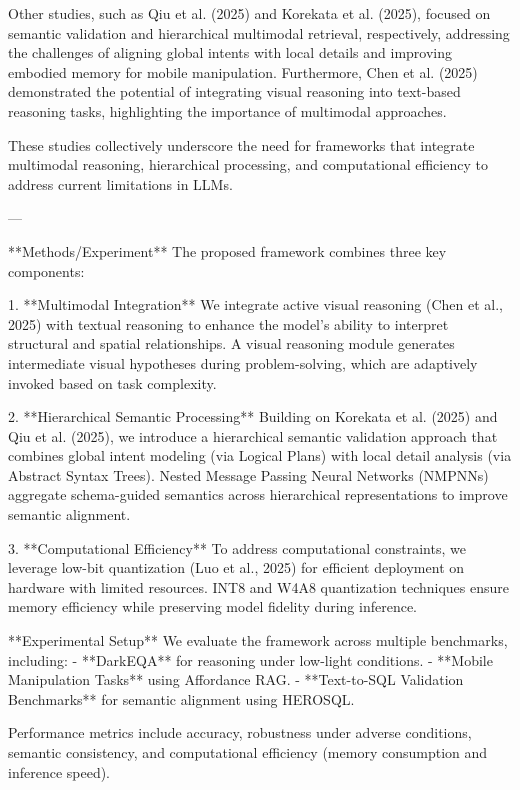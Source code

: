 Other studies, such as Qiu et al. (2025) and Korekata et al. (2025), focused on semantic validation and hierarchical multimodal retrieval, respectively, addressing the challenges of aligning global intents with local details and improving embodied memory for mobile manipulation. Furthermore, Chen et al. (2025) demonstrated the potential of integrating visual reasoning into text-based reasoning tasks, highlighting the importance of multimodal approaches.  

These studies collectively underscore the need for frameworks that integrate multimodal reasoning, hierarchical processing, and computational efficiency to address current limitations in LLMs.  

---

**Methods/Experiment**  
The proposed framework combines three key components:  

1. **Multimodal Integration**  
We integrate active visual reasoning (Chen et al., 2025) with textual reasoning to enhance the model's ability to interpret structural and spatial relationships. A visual reasoning module generates intermediate visual hypotheses during problem-solving, which are adaptively invoked based on task complexity.  

2. **Hierarchical Semantic Processing**  
Building on Korekata et al. (2025) and Qiu et al. (2025), we introduce a hierarchical semantic validation approach that combines global intent modeling (via Logical Plans) with local detail analysis (via Abstract Syntax Trees). Nested Message Passing Neural Networks (NMPNNs) aggregate schema-guided semantics across hierarchical representations to improve semantic alignment.  

3. **Computational Efficiency**  
To address computational constraints, we leverage low-bit quantization (Luo et al., 2025) for efficient deployment on hardware with limited resources. INT8 and W4A8 quantization techniques ensure memory efficiency while preserving model fidelity during inference.  

**Experimental Setup**  
We evaluate the framework across multiple benchmarks, including:  
- **DarkEQA** for reasoning under low-light conditions.  
- **Mobile Manipulation Tasks** using Affordance RAG.  
- **Text-to-SQL Validation Benchmarks** for semantic alignment using HEROSQL.  

Performance metrics include accuracy, robustness under adverse conditions, semantic consistency, and computational efficiency (memory consumption and inference speed).  

